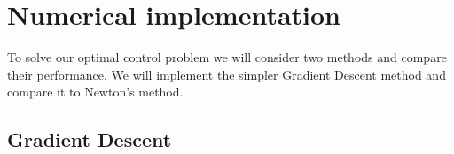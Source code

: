 \section{Numerical implementation}
To solve our optimal control problem we will consider two methods and compare their performance. We will implement the simpler Gradient Descent method and compare it to Newton's method. 



\subsection{Gradient Descent}